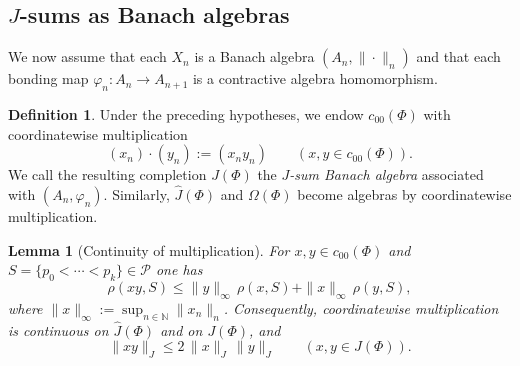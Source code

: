\documentclass[reqno]{amsart}
\theoremstyle{plain}
\newtheorem{lemma}[theorem]{Lemma}
\theoremstyle{definition}
\newtheorem{definition}[theorem]{Definition}
\theoremstyle{remark}
\newcommand{\N}{\mathbb{N}}
\renewcommand{\le}{\leqslant}
\begin{document}
\subsection{$J$-sums as Banach algebras}\label{subsec:Jsum-algebras}

We now assume that each $X_n$ is a Banach algebra $(A_n,\|\cdot\|_n)$ and that
each bonding map $\varphi_n\colon A_n\to A_{n+1}$ is a contractive algebra
homomorphism.

\begin{definition}\label{def:Jsum-algebra}
Under the preceding hypotheses, we endow $c_{00}(\Phi)$ with coordinatewise
multiplication
\[
(x_n)\cdot(y_n) := (x_n y_n)\qquad (x,y\in c_{00}(\Phi)).
\]
We call the resulting completion $J(\Phi)$ the \emph{$J$-sum Banach algebra}
associated with $(A_n,\varphi_n)$.
Similarly, $\widehat{J}(\Phi)$ and $\Omega(\Phi)$ become algebras by
coordinatewise multiplication.
\end{definition}

\begin{lemma}[Continuity of multiplication]\label{lem:J-mult}
For $x,y\in c_{00}(\Phi)$ and $S=\{p_0<\cdots<p_k\}\in\mathcal{P}$ one has
\begin{equation}\label{eq:rho-product}
\rho(xy,S)
\le
\|y\|_{\infty}\,\rho(x,S) + \|x\|_{\infty}\,\rho(y,S),
\end{equation}
where $\|x\|_{\infty}:=\sup_{n\in\N}\|x_n\|_n$.
Consequently, coordinatewise multiplication is continuous on $\widehat{J}(\Phi)$ and on $J(\Phi)$, and
\begin{equation}\label{eq:J-submult}
\|xy\|_{J} \le 2\,\|x\|_{J}\,\|y\|_{J}
\qquad (x,y\in J(\Phi)).
\end{equation}
\end{lemma}
\end{document}
